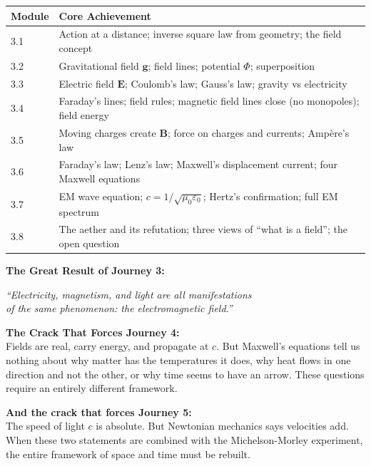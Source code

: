 \documentclass[12pt, a4paper, twoside]{book}
\theoremstyle{disc}
\begin{document}
\begin{tcolorbox}[enhanced,colback=deep!4,colframe=deep,
  title={\bfseries\color{white} Journey 3 at a Glance: Fields and the Invisible Universe},
  attach boxed title to top left={yshift=-2mm,xshift=4mm},
  boxed title style={colback=deep}]

\begin{tabular}{@{}p{3cm}p{10cm}@{}}
\toprule
\textbf{Module} & \textbf{Core Achievement} \\
\midrule
3.1 & Action at a distance; inverse square law from geometry; the field concept \\
3.2 & Gravitational field $\bm{g}$; field lines; potential $\Phi$; superposition \\
3.3 & Electric field $\bm{E}$; Coulomb's law; Gauss's law; gravity vs electricity \\
3.4 & Faraday's lines; field rules; magnetic field lines close (no monopoles); field energy \\
3.5 & Moving charges create $\bm{B}$; force on charges and currents; Amp\`ere's law \\
3.6 & Faraday's law; Lenz's law; Maxwell's displacement current; four Maxwell equations \\
3.7 & EM wave equation; $c = 1/\sqrt{\mu_0\varepsilon_0}$; Hertz's confirmation; full EM spectrum \\
3.8 & The aether and its refutation; three views of ``what is a field''; the open question \\
\bottomrule
\end{tabular}

\vspace{8pt}
\textbf{The Great Result of Journey 3:}
\begin{center}
\large\itshape\color{midblue}
``Electricity, magnetism, and light are all manifestations\\
of the same phenomenon: the electromagnetic field.''
\end{center}

\vspace{4pt}
\textbf{The Crack That Forces Journey 4:}\\
Fields are real, carry energy, and propagate at $c$. But Maxwell's equations tell us nothing about why matter has the temperatures it does, why heat flows in one direction and not the other, or why time seems to have an arrow. These questions require an entirely different framework.

\textbf{And the crack that forces Journey 5:}\\
The speed of light $c$ is absolute. But Newtonian mechanics says velocities add. When these two statements are combined with the Michelson-Morley experiment, the entire framework of space and time must be rebuilt.
\end{tcolorbox}
\end{document}
